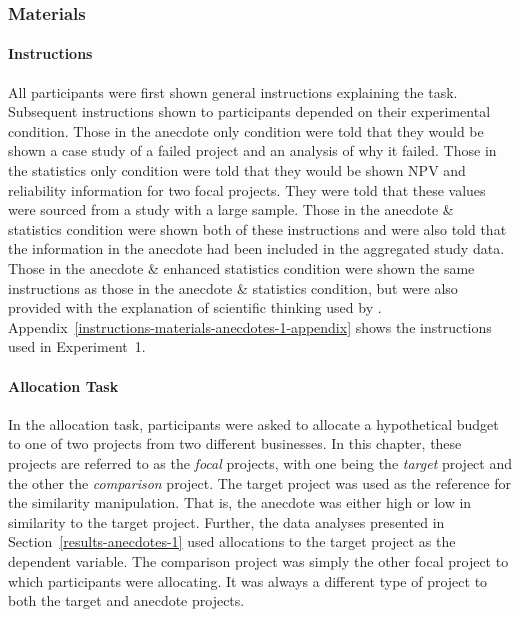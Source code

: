 \documentclass[a4paper, nobind]{templates/ociamthesis}
\theoremstyle{definition}
\theoremstyle{definition}
\theoremstyle{definition}
\theoremstyle{definition}
\theoremstyle{remark}
\begin{document}
\hypertarget{materials-anecdotes-1}{%
\subsubsection{Materials}\label{materials-anecdotes-1}}

\hypertarget{instructions-materials-anecdotes-1}{%
\paragraph{Instructions}\label{instructions-materials-anecdotes-1}}

All participants were first shown general instructions explaining the task.
Subsequent instructions shown to participants depended on their experimental
condition. Those in the anecdote only condition were told that they would be
shown a case study of a failed project and an analysis of why it failed. Those
in the statistics only condition were told that they would be shown NPV and
reliability information for two focal projects. They were told that these values
were sourced from a study with a large sample. Those in the anecdote \&
statistics condition were shown both of these instructions and were also told
that the information in the anecdote had been included in the aggregated study
data. Those in the anecdote \& enhanced statistics condition were shown the same
instructions as those in the anecdote \& statistics condition, but were also
provided with the explanation of scientific thinking used by \textcite{wainberg2018}.
Appendix~\ref{instructions-materials-anecdotes-1-appendix} shows the
instructions used in Experiment~1.

\paragraph{Allocation Task}

In the allocation task, participants were asked to allocate a hypothetical
budget to one of two projects from two different businesses. In this chapter,
these projects are referred to as the \emph{focal} projects, with one being the
\emph{target} project and the other the \emph{comparison} project. The target project was
used as the reference for the similarity manipulation. That is, the anecdote was
either high or low in similarity to the target project. Further, the data
analyses presented in Section~\ref{results-anecdotes-1} used allocations to the
target project as the dependent variable. The comparison project was simply the
other focal project to which participants were allocating. It was always a
different type of project to both the target and anecdote projects.
\end{document}
